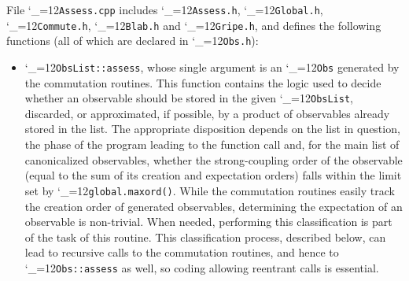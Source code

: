\documentclass [12pt]{article}
\makeatletter
\renewcommand{\tt}{\begingroup\catcode`_=12\def\_{\string_}\tt@}
\newcommand{\tt@}[1]{\texttt{#1}\endgroup}
\makeatother
\begin{document}
File \tt{Assess.cpp} includes
\tt{Assess.h},
\tt{Global.h},
\tt{Commute.h},
\tt{Blab.h} and
\tt{Gripe.h},
and defines the following functions
(all of which are declared in \tt{Obs.h}):
\begin{itemize}
\item
    \tt{ObsList::assess}, whose single argument is an
    \tt{Obs} generated by the commutation routines.
    This function contains the logic
    used to decide whether an observable
    should be stored in the given \tt{ObsList},
    discarded, or approximated, if possible,
    by a product of observables already stored in the list.
    The appropriate disposition depends on the
    list in question, the phase of the program
    leading to the function call and, for the main
    list of canonicalized observables,
    whether the strong-coupling order of the observable
    (equal to the sum of its creation and expectation orders)
    falls within the limit set by \tt{global.maxord()}.
    While the commutation routines easily track
    the creation order of generated observables,
    determining the expectation of an observable
    is non-trivial.
    When needed, performing this classification is part
    of the task of this routine.
    This classification process, described below, can lead to
    recursive calls to the commutation routines, and hence to
    \tt{Obs::assess} as well, so coding allowing reentrant
    calls is essential.


\end{itemize}
\end{document}

